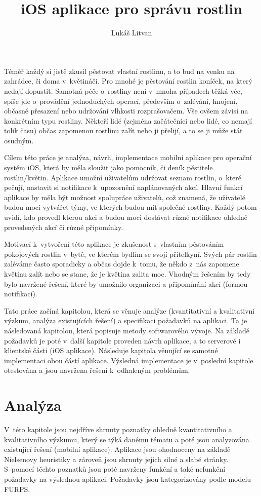 \documentclass[thesis=M,czech]{FITthesis}[2019/12/23]
\title{iOS aplikace pro správu rostlin}
\author{Lukáš Litvan}
\begin{document}
\begin{introduction}
	Téměř každý si jistě zkusil pěstovat vlastní rostlinu, a to buď na venku na zahrádce, či doma v~květináči. Pro mnohé je pěstování rostlin koníček, na který nedají dopustit. Samotná péče o~rostliny není v~mnoha případech těžká věc, spíše jde o~provádění jednoduchých operací, především o~zalévání, hnojení, občasné přesazení nebo udržování vlhkosti rozprašovačem. Vše ovšem závisí na konkrétním typu rostliny. Někteří lidé (zejména začátečníci nebo lidé, co nemají tolik času) občas zapomenou rostlinu zalít nebo ji přelijí, a to se ji může stát osudným.
	
	Cílem této práce je analýza, návrh, implementace mobilní aplikace pro operační systém iOS, která by měla sloužit jako pomocník, či deník pěstitele rostlin/květin. Aplikace umožní uživatelům udržovat seznam rostlin, o~které pečují, nastavit si notifikace k~upozornění naplánovaných akcí. Hlavní funkcí aplikace by měla být možnost spolupráce uživatelů, což znamená, že uživatelé budou moci vytvářet týmy, ve kterých budou mít společné rostliny. Každý potom uvidí, kdo provedl kterou akci a budou moci dostávat různé notifikace ohledně provedených akcí či různé připomínky.
	
	Motivací k~vytvoření této aplikace je zkušenost s~vlastním pěstováním pokojových rostlin v~bytě, ve kterém bydlím se svojí přítelkyní. Svých pár rostlin zaléváme často sporadicky a občas dojde k~tomu, že někdo z~nás zapomene květinu zalít nebo se stane, že je květina zalita moc. Vhodným řešením by tedy bylo navržené řešení, které by umožnilo organizaci a připomínání akcí (formou notifikací).
	
	Tato práce začíná kapitolou, která se věnuje analýze (kvantitativní a kvalitativní výzkum, analýza existujících řešení) a specifikaci požadavků na aplikaci. Ta je následovaná kapitolou, která popisuje metody softwarového vývoje. Na základě požadavků je poté v~další kapitole proveden návrh aplikace, a to serverové i klientské části (iOS aplikace). Následuje kapitola věnující se samotné implementaci obou částí aplikace. Výsledná implementace je v~poslední kapitole otestována a jsou navržena řešení k~odhaleným problémům.
\end{introduction}


\chapter{Analýza}
V~této kapitole jsou nejdříve shrnuty poznatky ohledně kvantitativního a kvalitativního výzkumu, který se týká danému tématu a poté jsou analyzována existující řešení (mobilní aplikace). Aplikace jsou ohodnoceny na základě Nielsenovy heuristiky a zároveň jsou shrnuty jejich silné a slabé stránky. S~pomocí těchto poznatků jsou poté navrženy funkční a také nefunkční požadavky na výslednou aplikaci. Požadavky jsou kategorizovány podle modelu FURPS.
\end{document}

